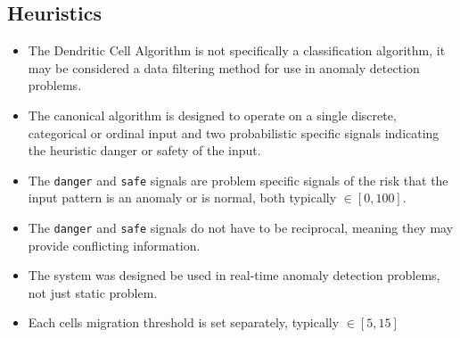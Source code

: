 \subsection{Heuristics}
\begin{itemize}
	\item The Dendritic Cell Algorithm is not specifically a classification algorithm, it may be considered a data filtering method for use in anomaly detection problems.
	\item The canonical algorithm is designed to operate on a single discrete, categorical or ordinal input and two probabilistic specific signals indicating the heuristic danger or safety of the input.
	\item The \texttt{danger} and \texttt{safe} signals are problem specific signals of the risk that the input pattern is an anomaly or is normal, both typically  $\in [0,100]$.
	\item The \texttt{danger} and \texttt{safe} signals do not have to be reciprocal, meaning they may provide conflicting information.
	\item The system was designed be used in real-time anomaly detection problems, not just static problem.
	\item Each cells migration threshold is set separately, typically $\in [5,15]$
\end{itemize}

